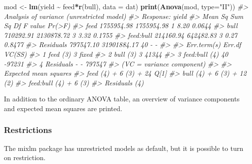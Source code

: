 \documentclass[
]{article}
\newenvironment{Shaded}{\begin{snugshade}}{\end{snugshade}}
\newcommand{\AttributeTok}[1]{\textcolor[rgb]{0.13,0.29,0.53}{#1}}
\newcommand{\CommentTok}[1]{\textcolor[rgb]{0.56,0.35,0.01}{\textit{#1}}}
\newcommand{\FunctionTok}[1]{\textcolor[rgb]{0.13,0.29,0.53}{\textbf{#1}}}
\newcommand{\NormalTok}[1]{#1}
\newcommand{\OtherTok}[1]{\textcolor[rgb]{0.56,0.35,0.01}{#1}}
\newcommand{\SpecialCharTok}[1]{\textcolor[rgb]{0.81,0.36,0.00}{\textbf{#1}}}
\newcommand{\StringTok}[1]{\textcolor[rgb]{0.31,0.60,0.02}{#1}}
\begin{document}
\begin{Shaded}
\begin{Highlighting}[]
\NormalTok{mod }\OtherTok{\textless{}{-}} \FunctionTok{lm}\NormalTok{(yield }\SpecialCharTok{\textasciitilde{}}\NormalTok{ feed}\SpecialCharTok{*}\FunctionTok{r}\NormalTok{(bull), }\AttributeTok{data =}\NormalTok{ dat)}
\FunctionTok{print}\NormalTok{(}\FunctionTok{Anova}\NormalTok{(mod, }\AttributeTok{type=}\StringTok{"II"}\NormalTok{))}
\CommentTok{\#\textgreater{} Analysis of variance (unrestricted model)}
\CommentTok{\#\textgreater{} Response: yield}
\CommentTok{\#\textgreater{}              Mean Sq      Sum Sq Df F value Pr(\textgreater{}F)}
\CommentTok{\#\textgreater{} feed      1755954.98  1755954.98  1    8.20 0.0644}
\CommentTok{\#\textgreater{} bull       710292.91  2130878.72  3    3.32 0.1755}
\CommentTok{\#\textgreater{} feed:bull  214160.94   642482.83  3    0.27 0.8477}
\CommentTok{\#\textgreater{} Residuals  797547.10 31901884.17 40       {-}      {-}}
\CommentTok{\#\textgreater{} }
\CommentTok{\#\textgreater{}             Err.term(s) Err.df VC(SS)}
\CommentTok{\#\textgreater{} 1 feed              (3)      3  fixed}
\CommentTok{\#\textgreater{} 2 bull              (3)      3  41344}
\CommentTok{\#\textgreater{} 3 feed:bull         (4)     40 {-}97231}
\CommentTok{\#\textgreater{} 4 Residuals           {-}      {-} 797547}
\CommentTok{\#\textgreater{} (VC = variance component)}
\CommentTok{\#\textgreater{} }
\CommentTok{\#\textgreater{}           Expected mean squares}
\CommentTok{\#\textgreater{} feed      (4) + 6 (3) + 24 Q[1]}
\CommentTok{\#\textgreater{} bull      (4) + 6 (3) + 12 (2) }
\CommentTok{\#\textgreater{} feed:bull (4) + 6 (3)          }
\CommentTok{\#\textgreater{} Residuals (4)}
\end{Highlighting}
\end{Shaded}

In addition to the ordinary ANOVA table, an overview of variance
components and expected mean squares are printed.

\subsubsection{Restrictions}\label{restrictions}

The mixlm package has unrestricted models as default, but it is possible
to turn on restriction.
\end{document}
